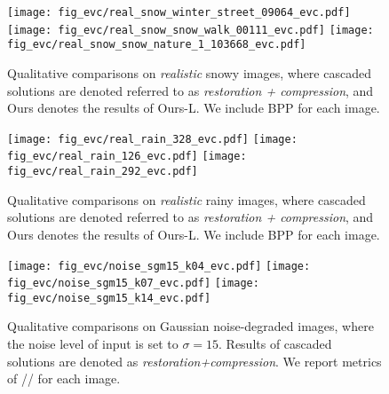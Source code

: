 \begin{figure*}[t]
\centering
\texttt{[image: fig\_evc/real\_snow\_winter\_street\_09064\_evc.pdf]}\vspace{-3pt}
\texttt{[image: fig\_evc/real\_snow\_snow\_walk\_00111\_evc.pdf]}\vspace{-3pt}
\texttt{[image: fig\_evc/real\_snow\_snow\_nature\_1\_103668\_evc.pdf]}\vspace{-0.15in}
\caption{Qualitative comparisons on \textit{realistic} snowy images, where cascaded solutions are denoted referred to as \textit{restoration + compression}, and Ours denotes the results of Ours-L. We include BPP for each image.}\vspace{-0.14in}
\label{fig:real_snow}
\end{figure*}


\begin{figure*}[t]
\centering
\texttt{[image: fig\_evc/real\_rain\_328\_evc.pdf]}\vspace{-2pt}
\texttt{[image: fig\_evc/real\_rain\_126\_evc.pdf]}\vspace{-2pt}
\texttt{[image: fig\_evc/real\_rain\_292\_evc.pdf]}\vspace{-0.16in}
\caption{Qualitative comparisons on \textit{realistic} rainy images, where cascaded solutions are denoted referred to as \textit{restoration + compression}, and Ours denotes the results of Ours-L. We include BPP for each image. } \vspace{-0.05in}  
\label{fig:real_rain}
\end{figure*}
 
 
 \begin{figure*}[t]
 \centering
\texttt{[image: fig\_evc/noise\_sgm15\_k04\_evc.pdf]}\vspace{-2pt}
\texttt{[image: fig\_evc/noise\_sgm15\_k07\_evc.pdf]}\vspace{-2pt}
\texttt{[image: fig\_evc/noise\_sgm15\_k14\_evc.pdf]}\vspace{-0.15in} 
\caption{Qualitative comparisons on Gaussian noise-degraded images, where the noise level of input is set to $\sigma=15$. Results of cascaded solutions are denoted as \textit{restoration+compression}. We report metrics of // for each image.}  \vspace{-0.05in}
\label{supp_fig:visual_noise_sgm15}
\end{figure*}





